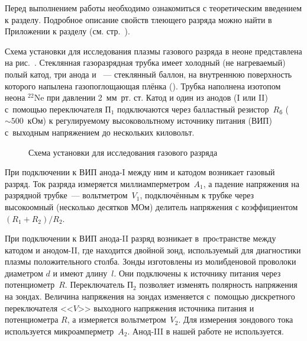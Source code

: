 


Перед выполнением работы необходимо ознакомиться с 
теоретическим введением к разделу.
Подробное описание свойств тлеющего разряда можно найти в Приложении к разделу
(см. стр.~\pageref{sec:discharge}).

Схема установки для исследования плазмы газового разряда в неоне представлена на
рис.~. Стеклянная газоразрядная
трубка имеет холодный (не нагреваемый) полый катод, три анода и
~--- стеклянный баллон, на
внутреннюю поверхность которого напылена газопоглощающая плёнка
(). Трубка наполнена изотопом неона
$^{22}$Ne при давлении 2~мм~рт. ст. Катод и один из анодов (I или II) с~помощью
переключателя $\text{П}_1$ подключаются через
балластный резистор~$R_\text{б}$ ($\sim500$~кОм) к регулируемому высоковольтному
источнику питания (ВИП) с~выходным
напряжением до нескольких киловольт.

\begin{figure}[h!]
    \centering
    \footnotesize
	\caption{Схема установки для исследования газового разряда}
\end{figure}

При подключении к ВИП анода-I между ним и катодом возникает газовый разряд. Ток
разряда измеряется миллиамперметром~$A_1$, а падение напряжения на разрядной трубке~--- 
вольтметром~$V_{1}$, подключённым к трубке через
высокоомный (несколько десятков МОм) делитель напряжения с коэффициентом
$(R_1+R_2)/R_2$.

При подключении к ВИП анода-II разряд возникает в~проcтранстве между катодом и
анодом-II, где находится двойной зонд,
используемый для диагностики плазмы положительного столба. Зонды изготовлены из
молибденовой проволоки диаметром
$d$ и имеют длину~$l$. Они подключены к источнику питания через
потенциометр~$R$. Переключатель
$\text{П}_2$ позволяет изменять полярность напряжения на зондах. Величина
напряжения на зондах изменяется с~помощью дискретного
переключателя <<$V$>> выходного напряжения источника питания и потенциометра
$R$, а измеряется вольтметром~$V_2$. Для
измерения зондового тока используется микроамперметр~$A_2$.
Анод-III в нашей работе не используется.

